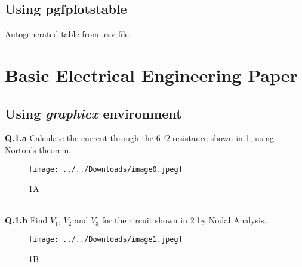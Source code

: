 \documentclass[12pt]{article}
\begin{document}
\subsection{Using pgfplotstable}
\begin{table}[h!]
  \begin{center}
    \label{table1}
  \end{center}
  \caption{Autogenerated table from .csv file.}
\end{table}
\newpage
\section{Basic Electrical Engineering Paper}
\subsection{Using \textit{graphicx} environment}
\textbf{Q.1.a} Calculate the current through the 6 $\Omega$ resistance shown in \ref{Fig 1}, using Norton's theorem.
\begin{figure}[h]
\centering
\texttt{[image: ../../Downloads/image0.jpeg]} 
\caption{1A}
\label{Fig 1}
\end{figure}
\\\textbf{Q.1.b} Find $V_{1}$, $V_{2}$ and $V_{3}$ for the circuit shown in \ref{Fig 2} by Nodal Analysis.
\begin{figure}[h]
\centering
\texttt{[image: ../../Downloads/image1.jpeg]} 
\caption{1B}
\label{Fig 2}
\end{figure}
\newpage
\twocolumn
\end{document}
